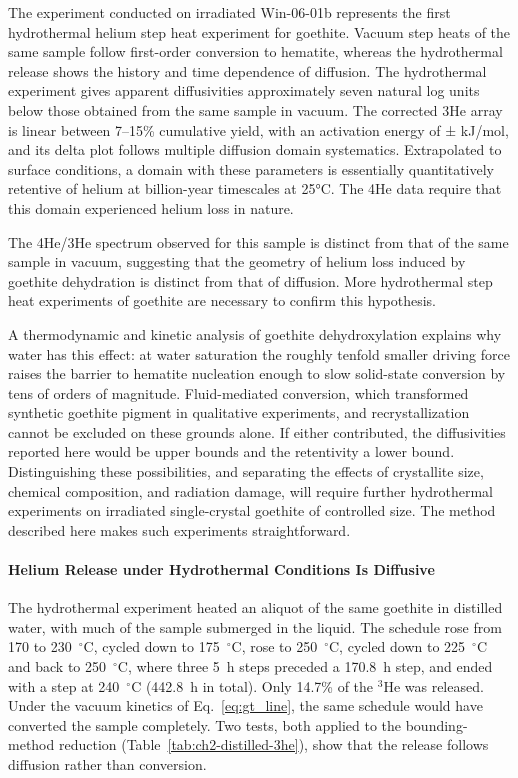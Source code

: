 The experiment conducted on irradiated Win-06-01b represents the first
hydrothermal helium step heat experiment for goethite. Vacuum step heats of the same sample follow
first-order conversion to hematite, whereas the hydrothermal release shows the history and time
dependence of diffusion. The hydrothermal experiment gives apparent
diffusivities approximately seven natural log units below those obtained
from the same sample in vacuum. The corrected 3He array is linear between
7--15\% cumulative yield, with an activation energy of \ChTwoEa ±
\ChTwoEaErr kJ/mol, and its delta plot follows multiple diffusion domain
systematics. Extrapolated to surface conditions, a domain with these
parameters is essentially quantitatively retentive of helium at
billion-year timescales at 25°C. The 4He data require that this domain
experienced helium loss in nature.

The 4He/3He spectrum observed for this sample is distinct from that of the
same sample in vacuum, suggesting that the geometry of helium loss induced
by goethite dehydration is distinct from that of diffusion. More
hydrothermal step heat experiments of goethite are necessary to confirm
this hypothesis.

A thermodynamic and kinetic analysis of goethite dehydroxylation explains why water has this
effect: at water saturation the roughly tenfold smaller driving
force raises the barrier to hematite nucleation enough to slow solid-state
conversion by tens of orders of magnitude. Fluid-mediated
conversion, which transformed synthetic goethite pigment in qualitative
experiments, and recrystallization cannot be excluded on these grounds alone.
If either contributed, the diffusivities reported here would be upper
bounds and the retentivity a lower bound. Distinguishing these
possibilities, and separating the effects of crystallite size, chemical
composition, and radiation damage, will require further hydrothermal
experiments on irradiated single-crystal goethite of controlled size. The
method described here makes such experiments straightforward.



\paragraph{Helium Release under Hydrothermal Conditions Is Diffusive}\label{sec:gt_hydro}

The hydrothermal experiment heated an aliquot of the same goethite in distilled water, with
much of the sample submerged in the liquid. The schedule rose from 170 to 230~$^\circ$C, cycled
down to 175~$^\circ$C, rose to 250~$^\circ$C, cycled down to 225~$^\circ$C and back to 250~$^\circ$C,
where three 5~h steps preceded a 170.8~h step, and ended with a step at 240~$^\circ$C (442.8~h in
total). Only 14.7\% of the $^3$He was released. Under the vacuum kinetics of
Eq.~\eqref{eq:gt_line}, the same schedule would have converted the sample completely. Two tests,
both applied to the bounding-method reduction (Table~\ref{tab:ch2-distilled-3he}), show that the
release follows diffusion rather than conversion.

